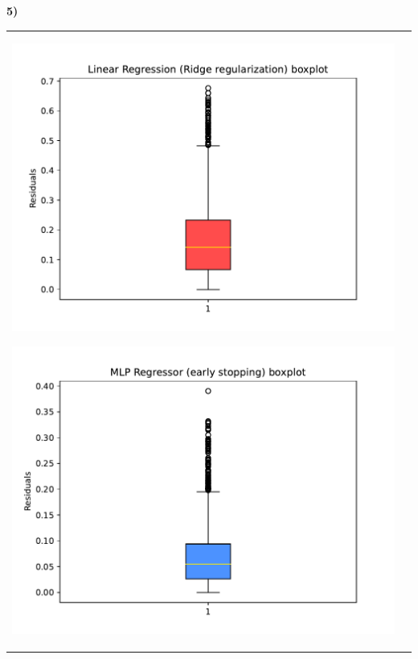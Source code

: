 \documentclass[11pt,a4paper]{article}
\begin{document}
\begin{flushleft}
  \vspace{-3mm}
  \textbf{5)}\vspace{-1mm}
  \begin{tabularx}{1.09\textwidth} {X X}
    \hspace{-7.25mm}\includegraphics[scale=0.6]{hw03_plot_linreg_box} \par
    \vspace{-2mm}\hspace{-7.25mm}\includegraphics[scale=0.6]{hw03_plot_mlp1_box} \par
     &

\end{tabularx}
\end{flushleft}
\end{document}
